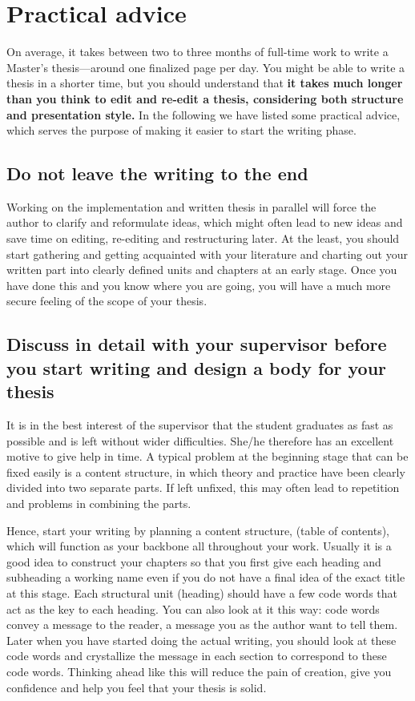 \section{Practical advice}

On average, it takes between two to three months of full-time work to
write a Master’s thesis---around one finalized page per day. You
might be able to write a thesis in a shorter time, but you should
understand that \textbf{it takes much longer than you think to edit
and re-edit a thesis, considering both structure and presentation
style.} In the following we have listed some practical advice, which
serves the purpose of making it easier to start the writing phase.

\subsection{Do not leave the writing to the end}

Working on the implementation and written thesis in parallel will
force the author to clarify and reformulate ideas, which might often
lead to new ideas and save time on editing, re-editing and
restructuring later. At the least, you should start gathering and
getting acquainted with your literature and charting out your written
part into clearly defined units and chapters at an early stage. Once
you have done this and you know where you are going, you will have a
much more secure feeling of the scope of your thesis.

\subsection{Discuss in detail with your supervisor before you start writing and design a body for your thesis}

It is in the best interest of the supervisor that the student
graduates as fast as possible and is left without wider difficulties.
She/he therefore has an excellent motive to give help in time. A
typical problem at the beginning stage that can be fixed easily is a
content structure, in which theory and practice have been clearly
divided into two separate parts. If left unfixed, this may often lead
to repetition and problems in combining the parts.

Hence, start your writing by planning a content structure, (table of
contents), which will function as your backbone all throughout your
work. Usually it is a good idea to construct your chapters so that
you first give each heading and subheading a working name even if you
do not have a final idea of the exact title at this stage. Each
structural unit (heading) should have a few code words that act as
the key to each heading. You can also look at it this way: code words
convey a message to the reader, a message you as the author want to
tell them. Later when you have started doing the actual writing, you
should look at these code words and crystallize the message in each
section to correspond to these code words. Thinking ahead like this
will reduce the pain of creation, give you confidence and help you
feel that your thesis is solid.

